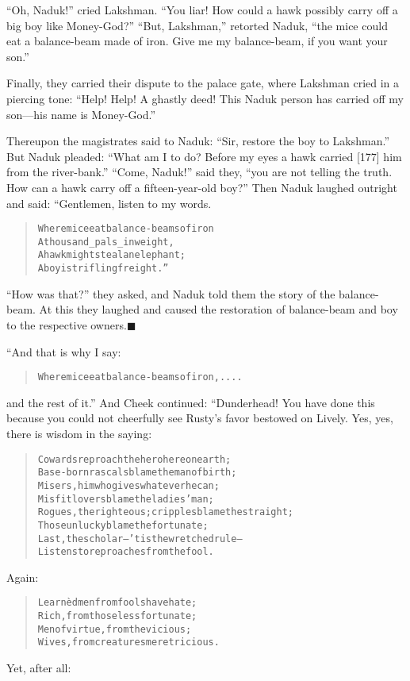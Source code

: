 \documentclass[article, twoside, 14pt]{memoir}
\newcommand{\qed}{\hfill \ensuremath{\blacksquare}}
\renewenvironment{verbatim}{%
\begin{quote}%
\vskip -10pt%
\begin{alltt}\normalfont\large}{\end{alltt}%
\end{quote}%
\vskip -10pt
} %
\begin{document}
``Oh, Naduk!'' cried Lakshman.
``You liar! How could a hawk possibly carry off a big boy like Money-God?''
``But, Lakshman,'' retorted Naduk,
``the mice could eat a balance-beam made of iron. Give me my balance-beam, if you want your son.''

Finally, they carried their dispute to the palace gate, where
Lakshman cried in a piercing tone:
``Help! Help! A ghastly deed! This Naduk person has carried off my son---his name is Money-God.''

Thereupon the magistrates said to Naduk:
``Sir, restore the boy to Lakshman.'' But Naduk pleaded:
``What am I to do? Before my eyes a hawk carried [177] him from the river-bank.''
``Come, Naduk!'' said they,
``you are not telling the truth. How can a hawk carry off a fifteen-year-old boy?''
Then Naduk laughed outright and said: “Gentlemen, listen to my
words.

\begin{verbatim}
Where mice eat balance-beams of iron
    A thousand _pals_ in weight,
A hawk might steal an elephant;
    A boy is trifling freight.”
\end{verbatim}
``How was that?'' they asked, and Naduk told them the story of the
balance-beam. At this they laughed and caused the restoration of
balance-beam and boy to the respective owners.\hyperref[s31]{\qed}

“And that is why I say:

\begin{verbatim}
Where mice eat balance-beams of iron, ....
\end{verbatim}
and the rest of it.” And Cheek continued: “Dunderhead! You have
done this because you could not cheerfully see Rusty's favor
bestowed on Lively. Yes, yes, there is wisdom in the saying:

\begin{verbatim}
Cowards reproach the hero here on earth;
Base-born rascals blame the man of birth;
Misers, him who gives whatever he can;
Misfit lovers blame the ladies' man;
Rogues, the righteous; cripples blame the straight;
Those unlucky blame the fortunate;
Last, the scholar--'tis the wretched rule--
Listens to reproaches from the fool.
\end{verbatim}
Again:

\begin{verbatim}
Learnèd men from fools have hate;
Rich, from those less fortunate;
Men of virtue, from the vicious;
Wives, from creatures meretricious.
\end{verbatim}
Yet, after all:
\end{document}
